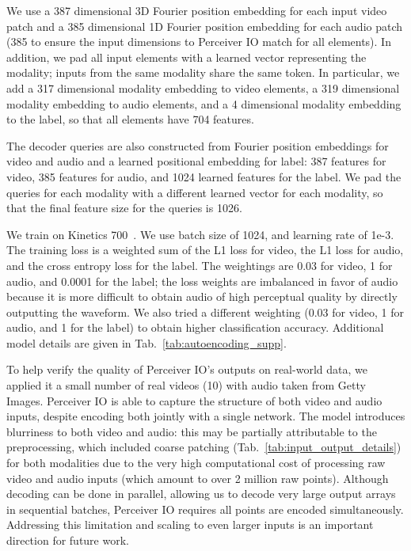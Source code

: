 \documentclass{article} \usepackage{iclr2022_conference,times}
\newcommand{\ourmodel}{Perceiver IO\xspace}
\begin{document}
We use a 387 dimensional 3D Fourier position embedding for each input video patch and a 385 dimensional 1D Fourier position embedding for each audio patch (385 to ensure the input dimensions to \ourmodel{} match for all elements).
In addition, we pad all input elements with a learned vector
representing the modality;
inputs from the same modality share the same token.
In particular,
we add a 317 dimensional modality embedding to video elements,
a 319 dimensional modality embedding to audio elements,
and a 4 dimensional modality embedding to the label,
so that all elements have 704 features.

The decoder queries are also constructed from Fourier position embeddings for video and audio and a learned positional embedding for label:
387 features for video,
385 features for audio,
and 1024 learned features for the label.
We pad the queries for each modality with a different learned vector for each modality,
so that the final feature size for the queries is 1026.

We train on Kinetics 700~\citep{smaira2020short}. We use batch size of 1024, and learning rate of 1e-3. The training loss is a weighted sum of the L1 loss for video, the L1 loss for audio, and the cross entropy loss for the label. The weightings are 0.03 for video, 1 for audio, and 0.0001 for the label; the loss weights are imbalanced in favor of audio because it is more difficult to obtain
audio of high perceptual quality by directly outputting the waveform.
We also tried a different weighting (0.03 for video, 1 for audio, and 1 for the label) to obtain higher classification accuracy. Additional model details are given in Tab.~\ref{tab:autoencoding_supp}.

To help verify the quality of \ourmodel{}'s outputs on real-world data, we applied it a small number of real videos (10) with audio taken from Getty Images. \ourmodel{} is able to capture the structure of both video and audio inputs, despite encoding both jointly with a single network. The model introduces blurriness to both video and audio: this may be partially attributable to the preprocessing, which included coarse patching (Tab.~\ref{tab:input_output_details}) for both modalities due to the very high computational cost of processing raw video and audio inputs (which amount to over 2 million raw points). Although decoding can be done in parallel, allowing us to decode very large output arrays in sequential batches, \ourmodel{} requires all points are encoded simultaneously. Addressing this limitation and scaling to even larger inputs is an important direction for future work.
\end{document}
